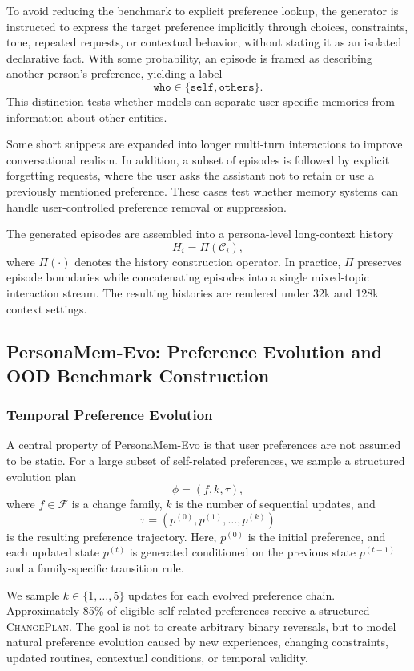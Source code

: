 \documentclass{article}
\begin{document}
To avoid reducing the benchmark to explicit preference lookup, the generator is instructed to express the target preference implicitly through choices, constraints, tone, repeated requests, or contextual behavior, without stating it as an isolated declarative fact. With some probability, an episode is framed as describing another person's preference, yielding a label
\[
\texttt{who} \in \{\texttt{self}, \texttt{others}\}.
\]
This distinction tests whether models can separate user-specific memories from information about other entities.

Some short snippets are expanded into longer multi-turn interactions to improve conversational realism. In addition, a subset of episodes is followed by explicit forgetting requests, where the user asks the assistant not to retain or use a previously mentioned preference. These cases test whether memory systems can handle user-controlled preference removal or suppression.

The generated episodes are assembled into a persona-level long-context history
\[
H_i = \Pi(\mathcal{C}_i),
\]
where $\Pi(\cdot)$ denotes the history construction operator. In practice, $\Pi$ preserves episode boundaries while concatenating episodes into a single mixed-topic interaction stream. The resulting histories are rendered under 32k and 128k context settings.

\subsection{PersonaMem-Evo: Preference Evolution and OOD Benchmark Construction}
\label{app:persona_ood}

\subsubsection{Temporal Preference Evolution}
\label{app:persona_temporal_evolution}
A central property of PersonaMem-Evo is that user preferences are not assumed to be static. For a large subset of self-related preferences, we sample a structured evolution plan
\[
\phi = (f, k, \tau),
\]
where $f \in \mathcal{F}$ is a change family, $k$ is the number of sequential updates, and
\[
\tau = \left(p^{(0)}, p^{(1)}, \ldots, p^{(k)}\right)
\]
is the resulting preference trajectory. Here, $p^{(0)}$ is the initial preference, and each updated state $p^{(t)}$ is generated conditioned on the previous state $p^{(t-1)}$ and a family-specific transition rule.

We sample $k \in \{1,\ldots,5\}$ updates for each evolved preference chain. Approximately 85\% of eligible self-related preferences receive a structured \textsc{ChangePlan}. The goal is not to create arbitrary binary reversals, but to model natural preference evolution caused by new experiences, changing constraints, updated routines, contextual conditions, or temporal validity.
\end{document}
